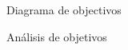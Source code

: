 \begin{subsection}{Diagrama de objectivos}

\end{subsection}

\begin{subsection}{Análisis de objetivos}

\end{subsection} 